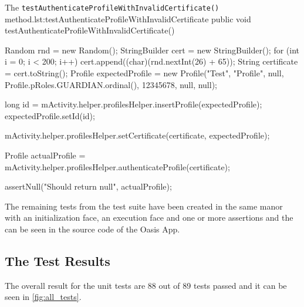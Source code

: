 \begin{Java}{The \texttt{testAuthenticateProfileWithInvalidCertificate()} method.}{lst:testAuthenticateProfileWithInvalidCertificate}
public void testAuthenticateProfileWithInvalidCertificate() {
	Random rnd = new Random();
	StringBuilder cert = new StringBuilder();
	for (int i = 0; i < 200; i++)
	{
		cert.append((char)(rnd.nextInt(26) + 65));
	}
	String certificate = cert.toString();
	Profile expectedProfile = new Profile("Test", "Profile", null, Profile.pRoles.GUARDIAN.ordinal(), 12345678, null, null);

	long id = mActivity.helper.profilesHelper.insertProfile(expectedProfile);
	expectedProfile.setId(id);
	
	mActivity.helper.profilesHelper.setCertificate(certificate, expectedProfile);
			
	Profile actualProfile = mActivity.helper.profilesHelper.authenticateProfile(certificate);

	assertNull("Should return null", actualProfile);
}
\end{Java}

The remaining tests from the test suite have been created in the same manor with an initialization face, an execution face and one or more assertions and the can be seen in the source code of the Oasis App.

\subsection{The Test Results}
The overall result for the unit tests are 88 out of 89 tests passed and it can be seen in \autoref{fig:all_tests}.

